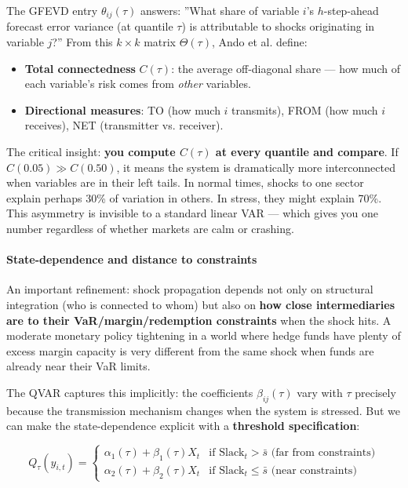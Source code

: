 \documentclass[11pt,a4paper]{article}
\begin{document}
The GFEVD entry $\theta_{ij}(\tau)$ answers: ''What share of variable $i$'s $h$-step-ahead forecast error variance (at quantile $\tau$) is attributable to shocks originating in variable $j$?'' From this $k \times k$ matrix $\Theta(\tau)$, Ando et al. define:
\begin{itemize}
\item \textbf{Total connectedness} $C(\tau)$: the average off-diagonal share --- how much of each variable's risk comes from \textit{other} variables.
\item \textbf{Directional measures}: TO (how much $i$ transmits), FROM (how much $i$ receives), NET (transmitter vs. receiver).

\end{itemize}
The critical insight: \textbf{you compute $C(\tau)$ at every quantile and compare}. If $C(0.05) \gg C(0.50)$, it means the system is dramatically more interconnected when variables are in their left tails. In normal times, shocks to one sector explain perhaps 30\% of variation in others. In stress, they might explain 70\%. This asymmetry is invisible to a standard linear VAR --- which gives you one number regardless of whether markets are calm or crashing.


\paragraph{State-dependence and distance to constraints}

An important refinement: shock propagation depends not only on structural integration (who is connected to whom) but also on \textbf{how close intermediaries are to their VaR/margin/redemption constraints} when the shock hits. A moderate monetary policy tightening in a world where hedge funds have plenty of excess margin capacity is very different from the same shock when funds are already near their VaR limits.

The QVAR captures this implicitly: the coefficients $\beta_{ij}(\tau)$ vary with $\tau$ precisely because the transmission mechanism changes when the system is stressed. But we can make the state-dependence explicit with a \textbf{threshold specification}:

\[Q_\tau(y_{i,t}) = \begin{cases} \alpha_1(\tau) + \beta_1(\tau) X_t & \text{if } \text{Slack}_t > \bar{s} \text{ (far from constraints)} \\ \alpha_2(\tau) + \beta_2(\tau) X_t & \text{if } \text{Slack}_t \leq \bar{s} \text{ (near constraints)} \end{cases}\]
\end{document}

